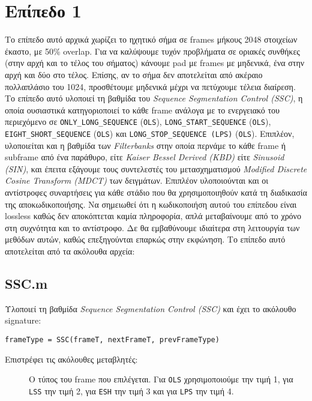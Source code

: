 \section*{Επίπεδο 1}
Το επίπεδο αυτό αρχικά χωρίζει το ηχητικό σήμα σε frames μήκους 2048 στοιχείων
έκαστο, με 50\% overlap. Για να καλύψουμε τυχόν προβλήματα σε οριακές συνθήκες
(στην αρχή και το τέλος του σήματος) κάνουμε pad με frames με μηδενικά, ένα
στην αρχή και δύο στο τέλος. Επίσης, αν το σήμα δεν αποτελείται από ακέραιο
πολλαπλάσιο του 1024, προσθέτουμε μηδενικά μέχρι να πετύχουμε τέλεια διαίρεση.
Το επίπεδο αυτό υλοποιεί τη βαθμίδα του \emph{Sequence Segmentation Control
(SSC)}, η οποία ουσιαστικά κατηγοριοποιεί το κάθε frame ανάλογα με το
ενεργειακό του περιεχόμενο σε \verb|ONLY_LONG_SEQUENCE| (\verb|OLS|),
\verb|LONG_START_SEQUENCE| (\verb|OLS|), \verb|EIGHT_SHORT_SEQUENCE|
(\verb|OLS|) και \verb|LONG_STOP_SEQUENCE (LPS)| (\verb|OLS|). Επιπλέον,
υλοποιείται και η βαθμίδα των \emph{Filterbanks} στην οποία περνάμε το κάθε
frame ή subframe από ένα παράθυρο, είτε \emph{Kaiser Bessel Derived (KBD)} είτε
\emph{Sinusoid (SIN)}, και έπειτα εξάγουμε τους συντελεστές του μετασχηματισμού
\emph{Modified Discrete Cosine Transform (MDCT)} των δειγμάτων. Επιπλέον
υλοποιούνται και οι αντίστροφες συναρτήσεις για κάθε στάδιο που θα
χρησιμοποιηθούν κατά τη διαδικασία της αποκωδικοποιήσης. Να σημειωθεί ότι η
κωδικοποιήση αυτού του επίπεδου είναι lossless καθώς δεν αποκόπτεται καμία
πληροφορία, απλά μεταβαίνουμε από το χρόνο στη συχνότητα και το αντίστροφο.
Δε θα εμβαθύνουμε ιδιαίτερα στη λειτουργία των μεθόδων αυτών, καθώς
επεξηγούνται επαρκώς στην εκφώνηση. Το επίπεδο αυτό αποτελείται από τα
ακόλουθα αρχεία:

\subsection*{SSC.m}
Υλοποιεί τη βαθμίδα \emph{Sequence Segmentation Control (SSC)} και έχει το
ακόλουθο signature:
\begin{center}
	\verb|frameType = SSC(frameT, nextFrameT, prevFrameType)|
\end{center}

\noindent Επιστρέφει τις ακόλουθες μεταβλητές:
\begin{description}
\item[] Ο τύπος του frame που επιλέγεται. Για \verb|OLS|
	χρησιμοποιούμε την τιμή 1, για 	\verb|LSS| την τιμή 2, για \verb|ESH| την
	τιμή 3 και για \verb|LPS| την τιμή 4.
\end{description}

